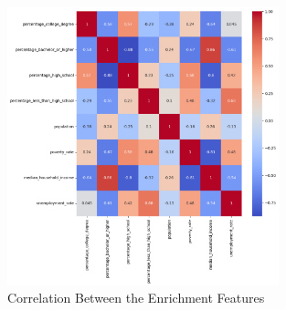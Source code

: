 \begin{figure}[h]
    \centering
    \includegraphics[width=0.7\textwidth]{images/CH03_Enrichment_Correlation.png}
    \caption{Correlation Between the Enrichment Features}
    \label{fig:CH03_Enrichment_Correlation}
\end{figure}